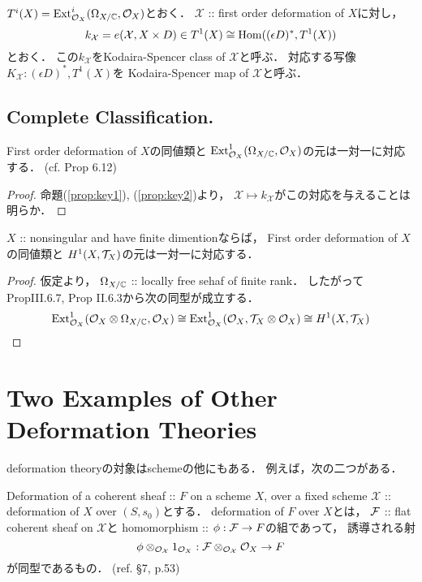 \documentclass[a4paper]{jsarticle}
\newcommand{\defX}{\mathcal{X}}
\begin{document}
    \begin{Def}\label{def:KSclass-map}
        $T^i(X)=\operatorname{Ext}^i_{\mathcal{O}_X}(\Omega_{X/\mathbb{C}}, \mathcal{O}_X)$とおく．
        $\defX$ :: first order deformation of $X$に対し，
        \[
            k_{\defX}=e(\defX, X \times D)
                \in T^1(X) \iso \Hom((\epsilon D)^*, T^1(X))
        \]
        とおく．
        この$k_{\defX}$をKodaira-Spencer class of $\defX$と呼ぶ．
        対応する写像$K_{\defX}: (\epsilon D)^*, T^1(X)$を
        Kodaira-Spencer map of $\defX$と呼ぶ．
    \end{Def}
    
\subsection{Complete Classification.}
    \begin{Thm}\label{thm:SpaceOf1stOrdDefOfLCI}
        First order deformation of $X$の同値類と
        $\operatorname{Ext}^1_{\mathcal{O}_X}(\Omega_{X/\mathbb{C}}, \mathcal{O}_X)$の元は一対一に対応する．
        (cf. \cite{DefLCI} Prop 6.12)
    \end{Thm}
    \begin{proof}
        命題(\ref{prop:key1}), (\ref{prop:key2})より，
        $\defX \mapsto k_{\defX}$がこの対応を与えることは明らか．
    \end{proof}

    \begin{Cor} \label{cor:nonsing-fod}
        $X$ :: nonsingular and have finite dimentionならば，
        First order deformation of $X$の同値類と
        $H^1(X, \mathcal{T}_X)$の元は一対一に対応する．
    \end{Cor}
    \begin{proof}
        仮定より，
        $\Omega_{X/\mathbb{C}}$ :: locally free sehaf of finite rank．
        したがって\cite{HarAG} PropIII.6.7, Prop II.6.3から次の同型が成立する．
        \[
            \operatorname{Ext}^1_{\mathcal{O}_X}(\mathcal{O}_X \otimes \Omega_{X/\mathbb{C}}, \mathcal{O}_X)
            \cong \operatorname{Ext}^1_{\mathcal{O}_X}(\mathcal{O}_X, \mathcal{T}_X \otimes \mathcal{O}_X)
            \cong H^1(X, \mathcal{T}_X)
        \]
    \end{proof}

\section{Two Examples of Other Deformation Theories}
    deformation theoryの対象はschemeの他にもある．
    例えば，次の二つがある．

    \begin{itembox}[l]{Deformation of a coherent sheaf :: $F$ on a scheme $X$, over a fixed scheme}
        $\defX$ :: deformation of $X$ over $(S, s_0)$とする．
        deformation of $F$ over $X$とは，
        $\mathcal{F}$ :: flat coherent sheaf on $\defX$と
        homomorphism :: $\phi: \mathcal{F} \to F$の組であって，
        誘導される射
        \[ \phi \otimes_{\shO_{\defX}} 1_{\shO_{X}}: \shF \otimes_{\shO_{\defX}} \shO_{X} \to F \]
        が同型であるもの．
        (ref. \cite{HarDef} \S 7, p.53)
    \end{itembox}
\end{document}
